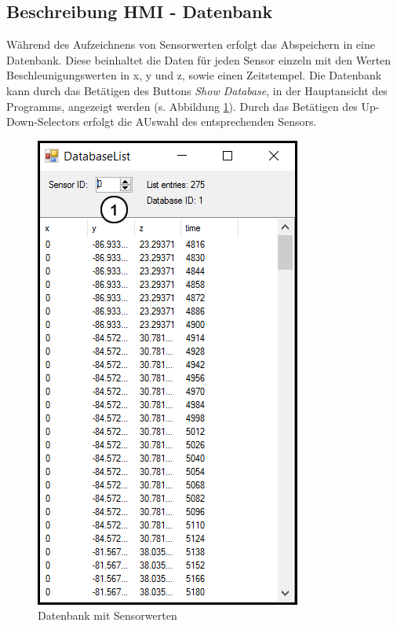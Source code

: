 \subsection{Beschreibung HMI - Datenbank}
\label{kap:ClientGraphProgrammDatenbank}
Während des Aufzeichnens von Sensorwerten erfolgt das Abspeichern in eine Datenbank. Diese beinhaltet die Daten für jeden Sensor einzeln mit den Werten Beschleunigungswerten in x, y und z, sowie einen Zeitstempel. Die Datenbank kann durch das Betätigen des Buttons \textit{Show Database}, in der Hauptansicht des Programms, angezeigt werden (s. Abbildung \ref{fig:clientgraphdatabase}). Durch das Betätigen des Up-Down-Selectors erfolgt die AUswahl des entsprechenden Sensors.

\begin{figure}[H]
\centering
\includegraphics[width=0.5\linewidth]{Bilder/ClientGraphDatabase}
\caption[Datenbank mit Sensorwerten]{Datenbank mit Sensorwerten}
\label{fig:clientgraphdatabase}
\end{figure}
